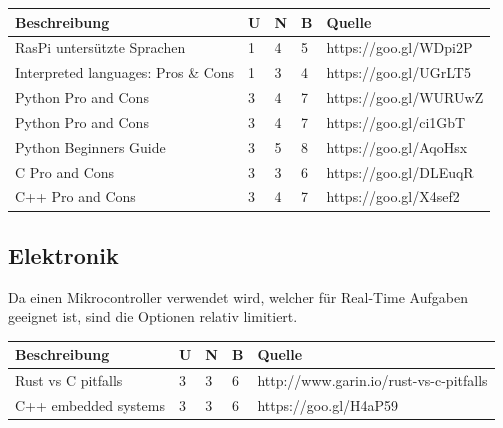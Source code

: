 \documentclass[a4paper]{report}
\begin{document}
\vspace{1em}
\noindent
\begin{tabular}{|p{}|p{}|p{}|p{}|p{}|}
	\hline
	\textbf{Beschreibung} & \textbf{U} & \textbf{N} & \textbf{B} & \textbf{Quelle} \\
	\hline
	RasPi untersützte Sprachen & 1 & 4 & 5 & https://goo.gl/WDpi2P \\
	\hline
	Interpreted languages: Pros \& Cons & 1 & 3 & 4 & https://goo.gl/UGrLT5 \\
	\hline
	Python Pro and Cons & 3 & 4  & 7 & https://goo.gl/WURUwZ \\
	\hline
	Python Pro and Cons & 3 & 4 & 7 & https://goo.gl/ci1GbT \\
	\hline
	Python Beginners Guide & 3 & 5 & 8 & https://goo.gl/AqoHsx\\
	\hline
	C Pro and Cons & 3 & 3 & 6 & https://goo.gl/DLEuqR \\
	\hline
	C++ Pro and Cons & 3 & 4 & 7 & https://goo.gl/X4sef2\\
	\hline
\end{tabular}

\subsection{Elektronik}
Da einen Mikrocontroller verwendet wird, welcher für Real-Time Aufgaben
geeignet ist, sind die Optionen relativ limitiert.

\vspace{1em}
\noindent
\begin{tabular}{|p{}|p{}|p{}|p{}|p{}|}
	\hline
	\textbf{Beschreibung} & \textbf{U} & \textbf{N} & \textbf{B} & \textbf{Quelle} \\
	\hline
  Rust vs C pitfalls & 3 & 3 & 6 & http://www.garin.io/rust-vs-c-pitfalls \\
  \hline
  C++ embedded systems & 3 & 3 & 6 & https://goo.gl/H4aP59 \\
	\hline
\end{tabular}
\end{document}
